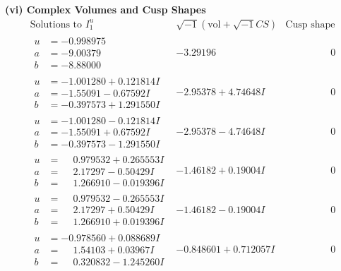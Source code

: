 \documentclass[1p]{elsarticle_modified}
\theoremstyle{definition}
\newcommand{\I}{\sqrt{-1}}
\begin{document}
\newpage\flushleft \textbf{(vi) Complex Volumes and Cusp Shapes}
$$\begin{array}{c|c|c}  
\text{Solutions to }I^u_{1}& \I (\text{vol} + \sqrt{-1}CS) & \text{Cusp shape}\\
 \hline 
\begin{aligned}
u &= -0.998975\phantom{ +0.000000I} \\
a &= -9.00379\phantom{ +0.000000I} \\
b &= -8.88000\phantom{ +0.000000I}\end{aligned}
 & -3.29196\phantom{ +0.000000I} & \phantom{-0.000000 } 0 \\ \hline\begin{aligned}
u &= -1.001280 + 0.121814 I \\
a &= -1.55091 - 0.67592 I \\
b &= -0.397573 + 1.291550 I\end{aligned}
 & -2.95378 + 4.74648 I & \phantom{-0.000000 } 0 \\ \hline\begin{aligned}
u &= -1.001280 - 0.121814 I \\
a &= -1.55091 + 0.67592 I \\
b &= -0.397573 - 1.291550 I\end{aligned}
 & -2.95378 - 4.74648 I & \phantom{-0.000000 } 0 \\ \hline\begin{aligned}
u &= \phantom{-}0.979532 + 0.265553 I \\
a &= \phantom{-}2.17297 - 0.50429 I \\
b &= \phantom{-}1.266910 - 0.019396 I\end{aligned}
 & -1.46182 + 0.19004 I & \phantom{-0.000000 } 0 \\ \hline\begin{aligned}
u &= \phantom{-}0.979532 - 0.265553 I \\
a &= \phantom{-}2.17297 + 0.50429 I \\
b &= \phantom{-}1.266910 + 0.019396 I\end{aligned}
 & -1.46182 - 0.19004 I & \phantom{-0.000000 } 0 \\ \hline\begin{aligned}
u &= -0.978560 + 0.088689 I \\
a &= \phantom{-}1.54103 + 0.03967 I \\
b &= \phantom{-}0.320832 - 1.245260 I\end{aligned}
 & -0.848601 + 0.712057 I & \phantom{-0.000000 } 0 \\ \hline\begin{aligned}

\end{aligned}
\end{array}$$
\end{document}
